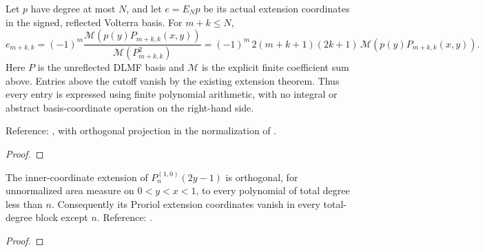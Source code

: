 \begin{supporting}
\begin{theorem}
\label{thm:proriol-extension-moments}
\leanok
Let $p$ have degree at most $N$, and let $e=E_Np$ be its actual extension
coordinates in the signed, reflected Volterra basis. For $m+k\le N$,
\[
 e_{m+k,k}=(-1)^m\frac{\mathcal M(p(y)P_{m+k,k}(x,y))}
                           {\mathcal M(P_{m+k,k}^2)}
 =(-1)^m\,2(m+k+1)(2k+1)\,\mathcal M(p(y)P_{m+k,k}(x,y)).
\]
Here $P$ is the unreflected DLMF basis and $\mathcal M$ is the explicit finite
coefficient sum above. Entries above the cutoff vanish by the existing extension
theorem. Thus every entry is expressed using finite polynomial arithmetic,
with no integral or abstract basis-coordinate operation on the right-hand side.

Reference: \cite[Section 3.1]{gutleb-olver}, with orthogonal projection in the
normalization of \cite[18.37.8]{dlmf}.
\end{theorem}
\begin{proof}
\leanok
\end{proof}


\begin{theorem}
\label{thm:proriol-extension-degree-block}
\leanok
The inner-coordinate extension of $P_n^{(1,0)}(2y-1)$ is orthogonal, for
unnormalized area measure on $0<y<x<1$, to every polynomial of total degree
less than $n$. Consequently its Proriol extension coordinates vanish in every
total-degree block except $n$.
Reference: \cite[Section 3.1]{gutleb-olver}.
\end{theorem}
\begin{proof}
\leanok
\end{proof}
\end{supporting}


